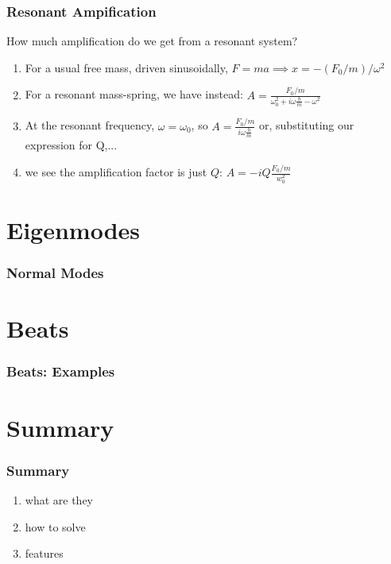 \documentclass[pdf,hideothersubsections]{beamer}
\begin{document}
\begin{frame}
\frametitle{Resonant Ampification}
How much amplification do we get from a resonant system?
\pause
\begin{enumerate}
\item For a usual free mass, driven sinusoidally, $F = m a \implies x = - (F_0/m) / \omega^2$
\pause
\item For a resonant mass-spring, we have instead: $A =
  \frac{F_0/m}{\omega_0^2 + i \omega \frac{b}{m} - \omega^2}$
\pause
\item At the resonant frequency, $\omega = \omega_0$, so $A =
  \frac{F_0/m}{i \omega \frac{b}{m}}$ or, substituting our expression
  for Q,...
\pause
\item we see the amplification factor is just $Q$:  $A = -i Q \frac{F_0/m}{w_0^2}$

\end{enumerate}

\end{frame}



\section{Eigenmodes}
\begin{frame}
\frametitle{Normal Modes}
\end{frame}


\section{Beats}
\begin{frame}
\frametitle{Beats: Examples}
\end{frame}




\section{Summary}
\begin{frame}
\frametitle{Summary}
\begin{enumerate}
\pause
\item what are they
\pause
\item how to solve
\pause
\item features

\end{enumerate}
\end{frame}
\end{document}
